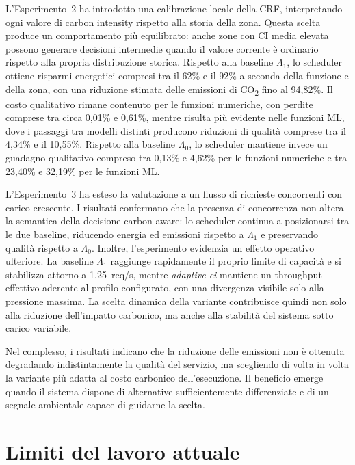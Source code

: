 L'Esperimento~2 ha introdotto una calibrazione locale della CRF,
interpretando ogni valore di carbon intensity rispetto alla storia della
zona. Questa scelta produce un comportamento più equilibrato: anche zone con
CI media elevata possono generare decisioni intermedie quando il valore
corrente è ordinario rispetto alla propria distribuzione storica. Rispetto
alla baseline $\Lambda_1$, lo scheduler ottiene risparmi energetici compresi
tra il 62\% e il 92\% a seconda della funzione e della zona, con una
riduzione stimata delle emissioni di CO\textsubscript{2} fino al 94{,}82\%.
Il costo qualitativo rimane contenuto per le funzioni numeriche, con perdite
comprese tra circa 0{,}01\% e 0{,}61\%, mentre risulta più evidente nelle
funzioni ML, dove i passaggi tra modelli distinti producono riduzioni di
qualità comprese tra il 4{,}34\% e il 10{,}55\%. Rispetto alla baseline
$\Lambda_0$, lo scheduler mantiene invece un guadagno qualitativo compreso
tra 0{,}13\% e 4{,}62\% per le funzioni numeriche e tra 23{,}40\% e
32{,}19\% per le funzioni ML.

L'Esperimento~3 ha esteso la valutazione a un flusso di richieste
concorrenti con carico crescente. I risultati confermano che la presenza di
concorrenza non altera la semantica della decisione carbon-aware: lo
scheduler continua a posizionarsi tra le due baseline, riducendo energia ed
emissioni rispetto a $\Lambda_1$ e preservando qualità rispetto a
$\Lambda_0$. Inoltre, l'esperimento evidenzia un effetto operativo
ulteriore. La baseline $\Lambda_1$ raggiunge rapidamente il proprio limite
di capacità e si stabilizza attorno a 1{,}25~req/s, mentre
\emph{adaptive-ci} mantiene un throughput effettivo aderente al profilo
configurato, con una divergenza visibile solo alla pressione massima. La
scelta dinamica della variante contribuisce quindi non solo alla riduzione
dell'impatto carbonico, ma anche alla stabilità del sistema sotto carico
variabile.

Nel complesso, i risultati indicano che la riduzione delle emissioni non è
ottenuta degradando indistintamente la qualità del servizio, ma scegliendo
di volta in volta la variante più adatta al costo carbonico dell'esecuzione.
Il beneficio emerge quando il sistema dispone di alternative sufficientemente
differenziate e di un segnale ambientale capace di guidarne la scelta.

\section{Limiti del lavoro attuale}

